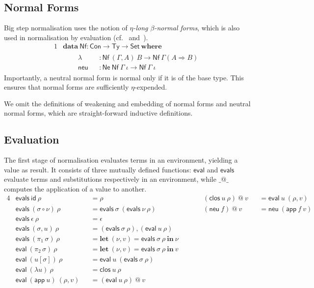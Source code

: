 \documentclass[a4paper,english,cleveref,autoref,draft]{lipics-v2019}
\newcommand{\agdaSymb}[1]{\mathsf{#1}}
\newcommand{\agdaKW}[1]{\mathbf{#1}}
\newcommand{\ind}{\hspace{1em}}
\newcommand{\data}{\agdaKW{data}}
\newcommand{\where}{\agdaKW{where}}
\newcommand{\Alet}{\agdaKW{let}}
\newcommand{\Ain}{\agdaKW{in}}
\newcommand{\Set}{\agdaSymb{Set}}
\newcommand{\Ty}{\agdaSymb{Ty}}
\newcommand{\Con}{\agdaSymb{Con}}
\newcommand{\id}{\agdaSymb{id}}
\newcommand{\app}{\agdaSymb{app}}
\newcommand{\lam}{\lambda}
\newcommand{\Ne}{\agdaSymb{Ne}}
\newcommand{\neu}{\agdaSymb{neu}}
\newcommand{\clos}{\agdaSymb{clos}}
\newcommand{\Nf}{\agdaSymb{Nf}}
\newcommand{\NN}{\Ne\ \Nf}
\newcommand{\eval}{\agdaSymb{eval}}
\newcommand{\evals}{\agdaSymb{evals}}
\newcommand{\Ra}{\Rightarrow}
\begin{document}
\subsection{Normal Forms}
Big step normalisation uses the notion of \emph{$\eta$-long $\beta$-normal forms},
which is also used in normalisation by evaluation
(cf.~\cite{altenkirch1995categorical} and~\cite{kaposi2016normalisation}).
\begin{alignat*}{1}
  & \data\ \Nf : \Con \to \Ty \to \Set\ \where \\ & \ind
  \begin{alignedat}{2}
    & \lam && : \Nf\ (\Gamma,A)\ B \to \Nf\ \Gamma (A \Ra B) \\
    & \neu && : \NN\ \Gamma\ \iota \to \Nf\ \Gamma\ \iota
  \end{alignedat}
\end{alignat*}
Importantly, a neutral normal form is normal only if it is of the base type.
This ensures that normal forms are sufficiently $\eta$-expended.

We omit the definitions of weakening and embedding of normal forms and neutral
normal forms, which are straight-forward inductive definitions.

\subsection{Evaluation}
The first stage of normalisation evaluates terms in an environment, yielding
a value as result.
It consists of three mutually defined functions: $\eval$ and $\evals$
evaluate terms and substitutions respectively in an environment,
while $\_@\_$ computes the application of a value to another.
\begin{alignat*}{4}
  & \evals\ \id\ \rho && = \rho
  && (\clos\ u\ \rho)\ @\ v && = \eval\ u\ (\rho,v) \\
  & \evals\ (\sigma \circ \nu)\ \rho && = \evals\ \sigma\ (\evals\ \nu\ \rho)
  && (\neu\ f)\ @\ v && = \neu\ (\app\ f\ v) \\
  & \evals\ \epsilon\ \rho && = \epsilon \\
  & \evals\ (\sigma,u)\ \rho && = (\evals\ \sigma\ \rho) , (\eval\ u\ \rho) \\
  & \evals\ (\pi_1\, \sigma)\ \rho && = \Alet\ (\nu,v) = \evals\ \sigma\ \rho\ \Ain\ \nu \qquad &\\
  & \eval\ (\pi_2\, \sigma)\ \rho && = \Alet\ (\nu,v) = \evals\ \sigma\ \rho\ \Ain\ v \\
  & \eval\ (u[\sigma])\ \rho && = \eval\ u\ (\evals\ \sigma\ \rho) \\
  & \eval\ (\lam u)\ \rho && = \clos\ u\ \rho \\
  & \eval\ (\app\ u)\ (\rho,v) && = (\eval\ u\ \rho)\ @\ v
\end{alignat*}
\end{document}
